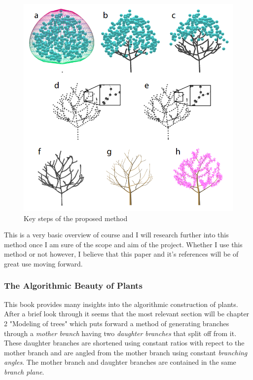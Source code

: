\documentclass[proposal]{cmpreport}
\begin{document}
\begin{figure}[h]
        \caption{Key steps of the proposed method}
        \includegraphics[scale=0.47]{AttractionPoints}
        \centering
\end{figure}

This is a very basic overview of course and I will research further into this method 
once I am sure of the scope and aim of the project. Whether I use this method or not 
however, I believe that this paper and it's references will be of great use moving 
forward.

\subsubsection{The Algorithmic Beauty of Plants}
This book \cite{beautyOfPlants} provides many insights into the algorithmic construction 
of plants. After a brief look through it seems that the most relevant section will be 
chapter 2 "Modeling of trees" which puts forward a method of generating branches through 
a \textit{mother branch} having two \textit{daughter branches} that split off from it. 
These daughter branches are shortened using constant ratios with repect to the mother 
branch and are angled from the mother branch using constant \textit{branching angles}. 
The mother branch and daughter branches are contained in the same \textit{branch plane}.
\end{document}
